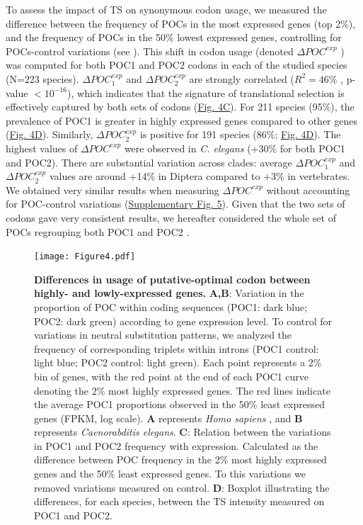 To assess the impact of TS on synonymous codon usage, we measured the difference between the frequency of POCs in the most expressed genes (top 2\%), and the frequency of POCs in the 50\% lowest expressed genes, controlling for POCs-control variations (see ). This shift in codon usage (denoted $\Delta POC^{exp}$ ) was computed for both POC1 and POC2 codons in each of the studied species (N=223 species). $\Delta POC_1^{exp}$ and $\Delta POC_2^{exp}$ are strongly correlated ($R^2=46$\% , p-value $< 10^{-16}$), which indicates that the signature of translational selection is effectively captured by both sets of codons (\hyperref[fig:CU4]{Fig. 4C}). For 211 species (95\%), the prevalence of POC1 is greater in highly expressed genes compared to other genes (\hyperref[fig:CU4]{Fig. 4D}). Similarly, $\Delta POC_2^{exp}$ is positive for 191 species (86\%; \hyperref[fig:CU4]{Fig. 4D}). The highest values of $\Delta POC^{exp}$ were observed in \textit{C. elegans} (+30\% for both POC1 and POC2). There are substantial variation across clades: average $\Delta POC_1^{exp}$ and $\Delta POC_2^{exp}$ values are around +14\% in Diptera compared to +3\% in vertebrates. We obtained very similar results when measuring $\Delta POC^{exp}$ without accounting for POC-control variations (\hyperref[suppfig:CU5]{Supplementary Fig. 5}). Given that the two sets of codons gave very consistent results, we hereafter considered the whole set of POCs regrouping both POC1 and POC2 .


\begin{figure}[t]   
    \begin{center}
        \texttt{[image: Figure4.pdf]}
    \end{center}                                                                       
    \caption[Differences in usage of putative-optimal codon between highly- and lowly-expressed genes]{\textbf{Differences in usage of putative-optimal codon between highly- and lowly-expressed genes.} \textbf{A,B}: Variation in the proportion of POC within coding sequences (POC1: dark blue; POC2: dark green) according to gene expression level. To control for variations in neutral substitution patterns, we analyzed the frequency of corresponding triplets within introns (POC1 control: light blue; POC2 control: light green). Each point represents a 2\% bin of genes, with the red point at the end of each POC1 curve denoting the 2\% most highly expressed genes. The red lines indicate the average POC1 proportions observed in the 50\% least expressed genes (FPKM, log scale). \textbf{A} represents \textit{Homo sapiens} , and \textbf{B} represents \textit{Caenorabditis elegans}. \textbf{C}: Relation between the variations in POC1 and POC2 frequency with expression. Calculated as the difference between POC frequency in the 2\% most highly expressed genes and the 50\% least expressed genes. To this variations we removed variations measured on control. \textbf{D}: Boxplot illustrating the differences, for each species, between the TS intensity measured on POC1 and POC2.
    }
    \label{fig:CU4}
\end{figure}


